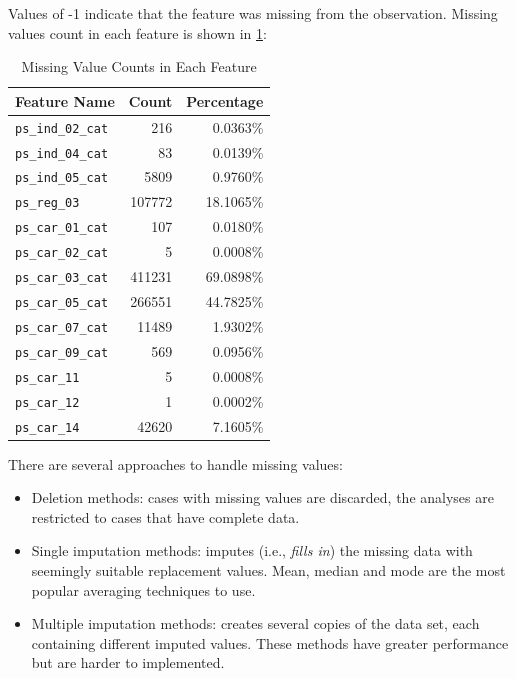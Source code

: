 \documentclass{standalone}
\begin{document}
Values of -1 indicate that the feature was missing from the observation.
Missing values count in each feature is shown in \cref{missing_count}:

\begin{table}[!ht]
\renewcommand{\arraystretch}{1.3}
\caption{Missing Value Counts in Each Feature}\label{missing_count}
\centering
\begin{tabular}{l|r|r}
\toprule
\bfseries Feature Name & \bfseries Count & \bfseries Percentage \\
\midrule
\verb|ps_ind_02_cat|  &      216 & 0.0363\%\\
\verb|ps_ind_04_cat|  &       83 & 0.0139\%\\
\verb|ps_ind_05_cat|  &     5809 & 0.9760\%\\
\verb|ps_reg_03|      &   107772 & 18.1065\%\\
\verb|ps_car_01_cat|  &      107 & 0.0180\%\\
\verb|ps_car_02_cat|  &        5 & 0.0008\%\\
\verb|ps_car_03_cat|  &   411231 & 69.0898\%\\
\verb|ps_car_05_cat|  &   266551 & 44.7825\%\\
\verb|ps_car_07_cat|  &    11489 & 1.9302\%\\
\verb|ps_car_09_cat|  &      569 & 0.0956\%\\
\verb|ps_car_11|      &        5 & 0.0008\%\\
\verb|ps_car_12|      &        1 & 0.0002\%\\
\verb|ps_car_14|      &    42620 & 7.1605\%\\
\bottomrule
\end{tabular}
\end{table}

There are several approaches to handle missing values\cite{Intro:Missing}:

\begin{itemize}
    \item Deletion methods: cases with missing values are discarded, the
        analyses are restricted to cases that have complete data.
    \item Single imputation methods: imputes (i.e., \emph{fills in}) the
        missing data with seemingly suitable replacement values. Mean, median
        and mode are the most popular averaging techniques to
        use\cite{Missing:Howto}.
    \item Multiple imputation methods: creates several copies of the data set,
        each containing different imputed values. These methods have greater
        performance but are harder to implemented.
\end{itemize}
\end{document}

